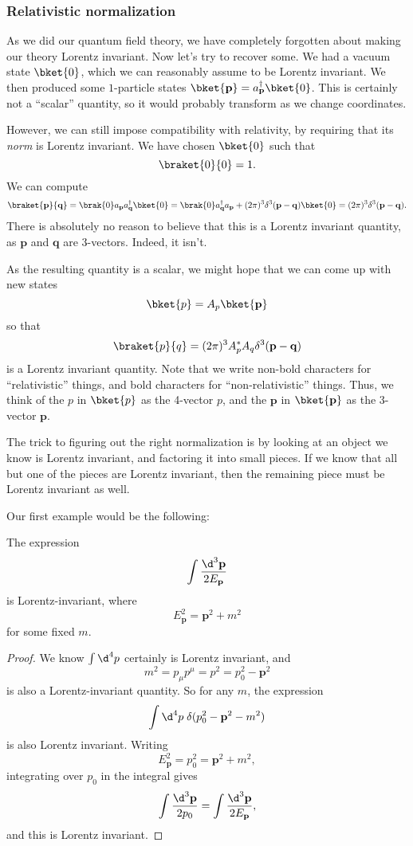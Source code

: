 \documentclass[a4paper]{article}
\begin{document}
\subsubsection*{Relativistic normalization}
As we did our quantum field theory, we have completely forgotten about making our theory Lorentz invariant. Now let's try to recover some. We had a vacuum state $\bket{0}$, which we can reasonably assume to be Lorentz invariant. We then produced some $1$-particle states $\bket{\mathbf{p}} = a_\mathbf{p}^\dagger \bket{0}$. This is certainly not a ``scalar'' quantity, so it would probably transform as we change coordinates.

However, we can still impose compatibility with relativity, by requiring that its \emph{norm} is Lorentz invariant. We have chosen $\bket{0}$ such that
\[
  \braket{0}{0} = 1.
\]
We can compute
\[
  \braket{\mathbf{p}}{\mathbf{q}} = \brak{0}a_\mathbf{p} a_\mathbf{q}^\dagger \bket{0} = \brak{0}a_\mathbf{q}^\dagger a_\mathbf{p} + (2\pi)^3 \delta^3(\mathbf{p} - \mathbf{q})\bket{0} = (2\pi)^3 \delta^3(\mathbf{p} - \mathbf{q}).
\]
There is absolutely no reason to believe that this is a Lorentz invariant quantity, as $\mathbf{p}$ and $\mathbf{q}$ are $3$-vectors. Indeed, it isn't.

As the resulting quantity is a scalar, we might hope that we can come up with new states
\[
  \bket{p} = A_p \bket{\mathbf{p}}
\]
so that
\[
  \braket{p}{q} = (2\pi)^3 A_p^* A_q \delta^3 (\mathbf{p} - \mathbf{q})
\]
is a Lorentz invariant quantity. Note that we write non-bold characters for ``relativistic'' things, and bold characters for ``non-relativistic'' things. Thus, we think of the $p$ in $\bket{p}$ as the 4-vector $p$, and the $\mathbf{p}$ in $\bket{\mathbf{p}}$ as the 3-vector $\mathbf{p}$.

The trick to figuring out the right normalization is by looking at an object we know is Lorentz invariant, and factoring it into small pieces. If we know that all but one of the pieces are Lorentz invariant, then the remaining piece must be Lorentz invariant as well.

Our first example would be the following:
\begin{prop}
  The expression
  \[
    \int \frac{\d^3 \mathbf{p}}{2 E_\mathbf{p}}
  \]
  is Lorentz-invariant, where
  \[
    E_\mathbf{p}^2 = \mathbf{p}^2 + m^2
  \]
  for some fixed $m$.
\end{prop}

\begin{proof}
  We know $\int \d^4 p$ certainly is Lorentz invariant, and
  \[
    m^2 = p_\mu p^\mu = p^2 = p_0^2 - \mathbf{p}^2
  \]
  is also a Lorentz-invariant quantity. So for any $m$, the expression
   \[
    \int \d^4 p\; \delta(p_0^2 - \mathbf{p}^2 - m^2)
  \]
  is also Lorentz invariant. Writing
  \[
    E_\mathbf{p}^2 = p_0^2 = \mathbf{p}^2 + m^2,
  \]
  integrating over $p_0$ in the integral gives
  \[
    \int \frac{\d^3 \mathbf{p}}{2p_0} =\int \frac{\d^3 \mathbf{p}}{2 E_\mathbf{p}},
  \]
  and this is Lorentz invariant.
\end{proof}
\end{document}

